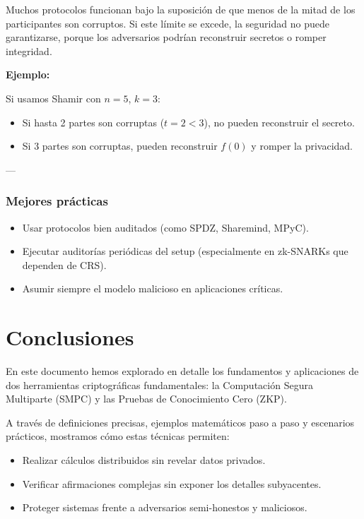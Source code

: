 \documentclass{article}
\begin{document}
Muchos protocolos funcionan bajo la suposición de que menos de la mitad de los participantes son corruptos. Si este límite se excede, la seguridad no puede garantizarse, porque los adversarios podrían reconstruir secretos o romper integridad.

\textbf{Ejemplo:}

Si usamos Shamir con \( n = 5 \), \( k = 3 \):
\begin{itemize}
    \item Si hasta 2 partes son corruptas (\( t = 2 < 3 \)), no pueden reconstruir el secreto.
    \item Si 3 partes son corruptas, pueden reconstruir \( f(0) \) y romper la privacidad.
\end{itemize}

---

\subsubsection{Mejores prácticas}

\begin{itemize}
    \item Usar protocolos bien auditados (como SPDZ, Sharemind, MPyC).
    \item Ejecutar auditorías periódicas del setup (especialmente en zk-SNARKs que dependen de CRS).
    \item Asumir siempre el modelo malicioso en aplicaciones críticas.
\end{itemize}

\section{Conclusiones}

En este documento hemos explorado en detalle los fundamentos y aplicaciones de dos herramientas criptográficas fundamentales: la Computación Segura Multiparte (SMPC) y las Pruebas de Conocimiento Cero (ZKP). 

A través de definiciones precisas, ejemplos matemáticos paso a paso y escenarios prácticos, mostramos cómo estas técnicas permiten:
\begin{itemize}
    \item Realizar cálculos distribuidos sin revelar datos privados.
    \item Verificar afirmaciones complejas sin exponer los detalles subyacentes.
    \item Proteger sistemas frente a adversarios semi-honestos y maliciosos.
\end{itemize}
\end{document}
